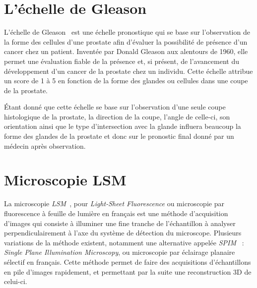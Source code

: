 {	\section{L'\'echelle de Gleason}
	{
		L'échelle de Gleason~\cite{cite_gleason_score} est une échelle pronostique qui se base sur l'observation de la forme des cellules d'une prostate afin d'évaluer la possibilité de présence d'un cancer chez un patient. Inventée par Donald Gleason aux alentours de 1960, elle permet une évaluation fiable de la présence et, si présent, de l'avancement du développement d'un cancer de la prostate chez un individu. Cette échelle attribue un score de 1 à 5 en fonction de la forme des glandes ou cellules dans une coupe de la prostate.\par
		\par
		Étant donné que cette échelle se base sur l'observation d'une seule coupe histologique de la prostate, la direction de la coupe, l'angle de celle-ci, son orientation ainsi que le type d'intersection avec la glande influera beaucoup la forme des glandes de la prostate et donc sur le pronostic final donné par un médecin après observation.
	}

	\section{Microscopie LSM}
	{
		\par

		La microscopie \textit{LSM}~\cite{cite_lsfm_explication_girard}, pour \textit{Light-Sheet Fluorescence} ou microscopie par fluorescence à feuille de lumière en français est une méthode d'acquisition d'images qui consiste à illuminer une fine tranche de l'échantillon à analyser perpendiculairement à l'axe du système de détection du microscope. Plusieurs variations de la méthode existent, notamment une alternative appelée \textit{SPIM}~\cite{cite_spim_explication_original} : \textit{Single Plane Illumination Microscopy}, ou microscopie par éclairage planaire sélectif en français. Cette méthode permet de faire des acquisitions d'échantillons en pile d'images rapidement, et permettant par la suite une reconstruction 3D de celui-ci.\\
		\par

}}
